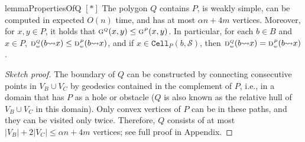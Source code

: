 \documentclass[a4paper,UKenglish]{socg-lipics-v2018}
\newcommand{\s}{\mathcal S}
\newcommand{\g}[3][P]{\ensuremath{\textsc{g}^{\scriptscriptstyle #1}(#2, #3)}}
\newcommand{\dd}[3][P]{\ensuremath{\textsc{d}_{\scriptscriptstyle w}^{\scriptscriptstyle #1}(#2 {\leadsto} #3)}}
\newcommand{\cell}[2][P]{\ensuremath{\mathtt{Cell}_{\scriptscriptstyle #1}(#2)}}
\begin{document}
\begin{restatable}{lemma}{PropertiesOfQ}\label{lemma:PropertiesOfQ}
\hyperref[ProofPropertiesOfQ]{$[*]$}
The polygon $Q$ contains $P$, is weakly simple, can be computed in expected $O(n)$ time, and has at most $\alpha n + 4m$ vertices.
Moreover, for $x,y\in P$, it holds that $\g[Q]{x}{y} \leq \g{x}{y}$. 
In particular, for each $b\in B$ and $x\in P$, $\dd[Q]{b}{x} \leq \dd{b}{x}$, and if $x\in \cell{b, \s}$, then $\dd[Q]{b}{x} = \dd{b}{x}$.
\end{restatable}
\begin{proof}[Sketch proof]
The boundary of $Q$ can be constructed by connecting consecutive points in $V_B\cup V_C$ by geodesics contained in the complement of $P$, i.e., in a domain that has $P$ as a hole or obstacle ($Q$ is also known as the relative hull of $V_B\cup V_C$ in this domain). 
Only convex vertices of $P$ can be in these paths, and they can be visited only twice.
Therefore, $Q$ consists of at most $|V_B| +  2|V_C| \leq \alpha n + 4m$ vertices; see full proof in Appendix. 
\end{proof}
\end{document}
